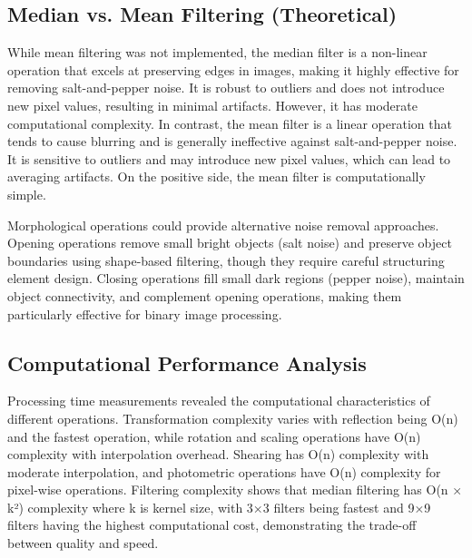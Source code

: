 \documentclass[a4paper, journal]{IEEEtran}
\begin{document}
\subsection{Median vs. Mean Filtering (Theoretical)}
While mean filtering was not implemented, the median filter is a non-linear operation that excels at preserving edges in images, making it highly effective for removing salt-and-pepper noise. It is robust to outliers and does not introduce new pixel values, resulting in minimal artifacts. However, it has moderate computational complexity. In contrast, the mean filter is a linear operation that tends to cause blurring and is generally ineffective against salt-and-pepper noise. It is sensitive to outliers and may introduce new pixel values, which can lead to averaging artifacts. On the positive side, the mean filter is computationally simple.

Morphological operations could provide alternative noise removal approaches. Opening operations remove small bright objects (salt noise) and preserve object boundaries using shape-based filtering, though they require careful structuring element design. Closing operations fill small dark regions (pepper noise), maintain object connectivity, and complement opening operations, making them particularly effective for binary image processing.

\subsection{Computational Performance Analysis}
Processing time measurements revealed the computational characteristics of different operations. Transformation complexity varies with reflection being O(n) and the fastest operation, while rotation and scaling operations have O(n) complexity with interpolation overhead. Shearing has O(n) complexity with moderate interpolation, and photometric operations have O(n) complexity for pixel-wise operations. Filtering complexity shows that median filtering has O(n × k²) complexity where k is kernel size, with 3×3 filters being fastest and 9×9 filters having the highest computational cost, demonstrating the trade-off between quality and speed.
\end{document}
